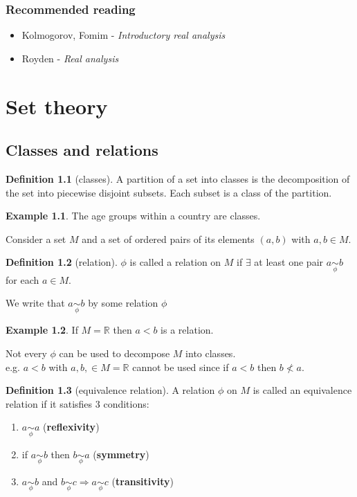 \documentclass[11pt,a4paper]{report}
\theoremstyle{plain}
\theoremstyle{definition}
\newtheorem*{defn}{Definition}
\newtheorem*{eg}{Example}
\theoremstyle{remark}
\newcommand{\R}{\mathbb{R}}
\newcommand{\PP}{$ \phi \;$}
\newcommand{\phirel}{\underset{\phi}{\sim}}
\begin{document}
\tableofcontents

\subsection*{Recommended reading}
\begin{itemize}
  \item Kolmogorov, Fomim - \textit{Introductory real analysis}
  \item Royden - \textit{Real analysis}

\end{itemize}

\chapter{Set theory}

\section{Classes and relations}

\begin{defn}[classes]
A partition of a set into classes is the decomposition of the set into piecewise disjoint subsets. Each subset is a class of the partition.
\end{defn}
\begin{eg}
The age groups within a country are classes.
\end{eg}
Consider a set $M$ and a set of ordered pairs of its elements $(a,b)$ with $a, b \in M$.

\begin{defn}[relation]
$\phi$ is called a relation on $M$ if $\exists$ at least one pair $a \phirel b$ for each $a \in M$.
\end{defn}
We write that $a \phirel b$ by some relation \PP 
\begin{eg}
If $M=\R$ then $a < b$ is a relation. 
\end{eg}
Not every $\phi$ can be used to decompose $M$ into classes.\\
e.g. $a < b$ with $a,b, \in M = \R$ cannot be used since if $a < b$ then $b \nless a$.


\begin{defn}[equivalence relation]
A relation $\phi$ on $M$ is called an equivalence relation if it satisfies 3 conditions:
\begin{enumerate}
    \item $a \phirel a$ (\textbf{reflexivity})
    \item if $a \phirel b$ then $b \phirel a$ (\textbf{symmetry})
    \item $a \phirel b$ and $b \phirel c \Rightarrow a \phirel c$ (\textbf{transitivity})
\end{enumerate}
\end{defn}
\end{document}
